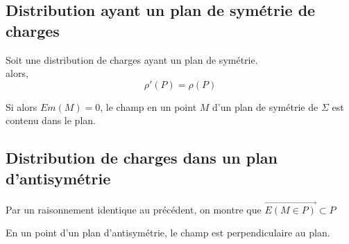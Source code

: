 \documentclass[../main.tex]{subfile}
\begin{document}
\subsection{Distribution ayant un plan de symétrie de charges}
	Soit une distribution de charges ayant un plan de symétrie.\\
	alors,
	$$\rho'(P) = \rho(P)$$


	Si %
	alors $Em(M) = 0$, 
	le champ en un point $M$ d'un plan de symétrie de $\Sigma$ est contenu dans le plan.

\subsection{Distribution de charges dans un plan d'antisymétrie}
	Par un raisonnement identique au précédent, on montre que %
	$\vec{E(M \in P)} \subset P$

En un point d'un plan d'antisymétrie, le champ est perpendiculaire au plan.
\end{document}

